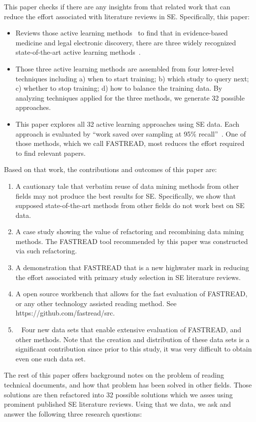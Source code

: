 \documentclass{svjour3}
\theoremstyle{break}
\newcommand{\respto}[1]{
\fcolorbox{black}{black!15}{
\label{response:#1}
\bf
  \scriptsize R-{#1}}~
}
\begin{document}
This paper checks if there are any insights from that related
work that can reduce the effort associated with literature reviews
in SE. Specifically, this paper:
\begin{itemize}
\item
Reviews those active learning methods~\cite{paynter2016epc,wallace2010semi,wallace2010active,cormack2014evaluation,cormack2015autonomy} to find that in evidence-based medicine and legal electronic discovery, there are three widely recognized state-of-the-art active learning methods~\cite{cormack2014evaluation,wallace2010semi,miwa2014reducing}.
\item
Those three active learning methods are assembled from four lower-level techniques including a) when to start training; b) which study to query next; c) whether to stop training; d) how to balance the training data. By analyzing techniques applied for the three methods, we generate 32 possible approaches.
\item
This paper explores all 32 active learning approaches using SE data. Each approach is evaluated by ``work saved over sampling at 95\% recall''~\cite{cohen2011performance}. 
One of those methods, which we   call FASTREAD,  most
reduces the effort required to find relevant papers.
\end{itemize}
Based on that work, the   contributions and outcomes of this paper are:
\begin{enumerate}
\item
A cautionary tale that  verbatim  reuse of data mining methods
from other fields may not produce the best results for SE.
Specifically, we  show that supposed state-of-the-art methods
from other fields do not work best on SE data.
\item
A case study showing the value  of refactoring 
and recombining data mining methods.  The FASTREAD tool recommended by this
paper was constructed via such refactoring.
\item
 A demonstration that  FASTREAD that is a new highwater mark in
 reducing the effort associated with  primary study selection in SE literature reviews.
 \item
 A open source workbench that allows for the fast evaluation of FASTREAD,
 or any other technology assisted reading method. See https://github.com/fastread/src. 
 \item
\respto{3a}Four new data sets that enable extensive evaluation of FASTREAD, and other methods. Note that the creation and distribution of these data sets is a significant contribution since prior to this study, it was  very difficult to obtain even one such data set. 
\end{enumerate}
The rest of this paper offers background notes on the problem of reading technical documents, and how that problem has been solved
in other fields. Those solutions are then refactored into 32
possible solutions which we asses using  prominent  published SE literature reviews.  Using that we data,
we ask and answer the following three research questions:
\end{document}
